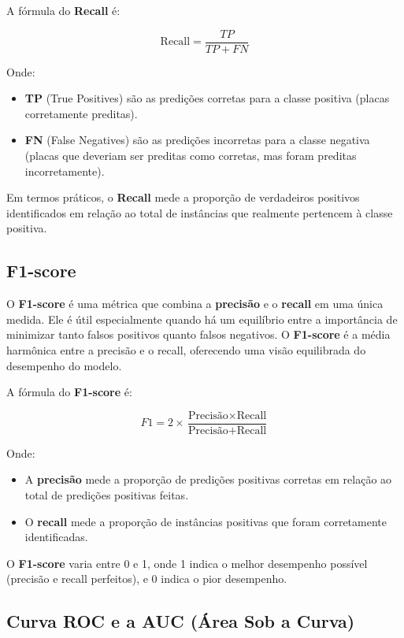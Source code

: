 \documentclass[conference]{IEEEtran}
\begin{document}
A fórmula do \textbf{Recall} é:

\[
\text{Recall} = \frac{TP}{TP + FN}
\]

Onde:

\begin{itemize}
	\item \textbf{TP} (True Positives) são as predições corretas para a classe positiva (placas corretamente preditas).
	\item \textbf{FN} (False Negatives) são as predições incorretas para a classe negativa (placas que deveriam ser preditas como corretas, mas foram preditas incorretamente).
\end{itemize}

Em termos práticos, o \textbf{Recall} mede a proporção de verdadeiros positivos identificados em relação ao total de instâncias que realmente pertencem à classe positiva.

\subsection{F1-score}

O \textbf{F1-score} é uma métrica que combina a \textbf{precisão} e o \textbf{recall} em uma única medida. Ele é útil especialmente quando há um equilíbrio entre a importância de minimizar tanto falsos positivos quanto falsos negativos. O \textbf{F1-score} é a média harmônica entre a precisão e o recall, oferecendo uma visão equilibrada do desempenho do modelo.

A fórmula do \textbf{F1-score} é:

\[
F1 = 2 \times \frac{\text{Precisão} \times \text{Recall}}{\text{Precisão} + \text{Recall}}
\]

Onde:

\begin{itemize}
	\item A \textbf{precisão} mede a proporção de predições positivas corretas em relação ao total de predições positivas feitas.
	\item O \textbf{recall} mede a proporção de instâncias positivas que foram corretamente identificadas.
\end{itemize}

O \textbf{F1-score} varia entre 0 e 1, onde 1 indica o melhor desempenho possível (precisão e recall perfeitos), e 0 indica o pior desempenho.

\subsection{Curva ROC e a AUC (Área Sob a Curva)}
\end{document}
